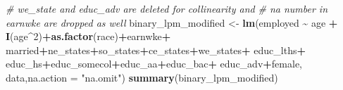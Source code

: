 \documentclass[
]{article}
\newenvironment{Shaded}{\begin{snugshade}}{\end{snugshade}}
\newcommand{\AttributeTok}[1]{\textcolor[rgb]{0.13,0.29,0.53}{#1}}
\newcommand{\CommentTok}[1]{\textcolor[rgb]{0.56,0.35,0.01}{\textit{#1}}}
\newcommand{\DecValTok}[1]{\textcolor[rgb]{0.00,0.00,0.81}{#1}}
\newcommand{\FunctionTok}[1]{\textcolor[rgb]{0.13,0.29,0.53}{\textbf{#1}}}
\newcommand{\NormalTok}[1]{#1}
\newcommand{\OtherTok}[1]{\textcolor[rgb]{0.56,0.35,0.01}{#1}}
\newcommand{\SpecialCharTok}[1]{\textcolor[rgb]{0.81,0.36,0.00}{\textbf{#1}}}
\newcommand{\StringTok}[1]{\textcolor[rgb]{0.31,0.60,0.02}{#1}}
\begin{document}
\begin{Shaded}
\begin{Highlighting}[]
\CommentTok{\# we\_state and educ\_adv are deleted for collinearity and }
\CommentTok{\# na number in earnwke are dropped as well}
\NormalTok{binary\_lpm\_modified }\OtherTok{\textless{}{-}} \FunctionTok{lm}\NormalTok{(employed }\SpecialCharTok{\textasciitilde{}}\NormalTok{ age }\SpecialCharTok{+} \FunctionTok{I}\NormalTok{(age}\SpecialCharTok{\^{}}\DecValTok{2}\NormalTok{)}\SpecialCharTok{+}\FunctionTok{as.factor}\NormalTok{(race)}\SpecialCharTok{+}\NormalTok{earnwke}\SpecialCharTok{+}
\NormalTok{                            married}\SpecialCharTok{+}\NormalTok{ne\_states}\SpecialCharTok{+}\NormalTok{so\_states}\SpecialCharTok{+}\NormalTok{ce\_states}\SpecialCharTok{+}\NormalTok{we\_states}\SpecialCharTok{+}
\NormalTok{                            educ\_lths}\SpecialCharTok{+}\NormalTok{ educ\_hs}\SpecialCharTok{+}\NormalTok{educ\_somecol}\SpecialCharTok{+}\NormalTok{educ\_aa}\SpecialCharTok{+}\NormalTok{educ\_bac}\SpecialCharTok{+}
\NormalTok{                            educ\_adv}\SpecialCharTok{+}\NormalTok{female, }
\NormalTok{                        data,}\AttributeTok{na.action =} \StringTok{"na.omit"}\NormalTok{)}
\FunctionTok{summary}\NormalTok{(binary\_lpm\_modified)}
\end{Highlighting}
\end{Shaded}
\end{document}
